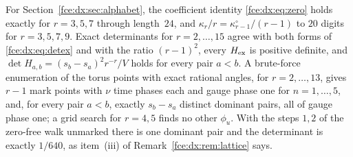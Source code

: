 \documentclass[11pt,a4paper]{article}
\numberwithin{equation}{section}
\theoremstyle{definition}\newtheorem{definition}[theorem]{Definition}
\theoremstyle{remark}\newtheorem{remark}[theorem]{Remark}
\begin{document}
For Section~\ref{fce:dx:sec:alphabet}, the coefficient identity
\eqref{fce:dx:eq:zero} holds exactly for $r=3,5,7$ through length~$24$, and
$\kappa_r/r=\kappa^\circ_{r-1}/(r-1)$ to $20$ digits for $r=3,5,7,9$. Exact
determinants for $r=2,\ldots,15$ agree with both forms of
\eqref{fce:dx:eq:detex} and with the ratio $(r-1)^2$, every $H_{\rm ex}$ is
positive definite, and $\det H_{a,b}=(s_b-s_a)^2r^{-r}/V$ holds for every pair
$a<b$. A brute-force enumeration of the torus points with exact rational
angles, for $r=2,\ldots,13$, gives $r-1$ mark points with $\nu$ time phases
each and gauge phase one for $n=1,\ldots,5$, and, for every pair $a<b$,
exactly $s_b-s_a$ distinct dominant pairs, all of gauge phase one; a grid
search for $r=4,5$ finds no other $\phi_u$. With the steps $1,2$ of the
zero-free walk unmarked there is one dominant pair and the determinant is
exactly $1/640$, as item~(iii) of Remark~\ref{fce:dx:rem:lattice} says.
\end{document}
